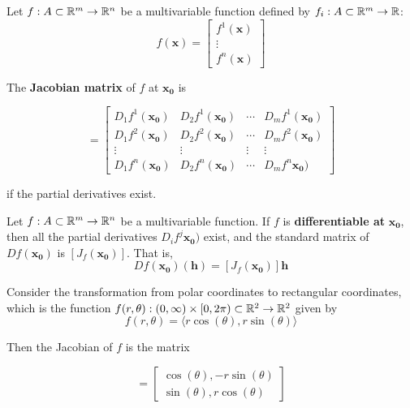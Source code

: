 \begin{definition}
    Let $f : A \subset \mathbb{R}^m \to \mathbb{R}^n$ be a multivariable function defined by $f_i  : A \subset \mathbb{R}^m \to \mathbb{R}$:
    \begin{equation*}
        f(\bm{x}) = \begin{bmatrix}
f^1(\bm{x}) \\
\vdots \\
f^n(\bm{x})
\end{bmatrix}
    \end{equation*}
    
    The \textbf{Jacobian matrix} of $f$ at $\bm{x_0}$ is 
    
    \begin{equation*}
        [J_f(\bm{x_0})] = \begin{bmatrix}
D_1f^1(\bm{x_0}) & D_2f^1(\bm{x_0}) & \cdots & D_mf^1(\bm{x_0}) \\
D_1f^2(\bm{x_0}) & D_2f^2(\bm{x_0}) & \cdots & D_mf^2(\bm{x_0}) \\
\vdots & \vdots & \vdots & \vdots\\
D_1f^n(\bm{x_0}) & D_2f^n(\bm{x_0}) & \cdots & D_mf^n\bm{x_0}) 
\end{bmatrix}
    \end{equation*}
    
    if the partial derivatives exist.
    
    \end{definition}

\begin{theorem}
    Let  $f : A \subset \mathbb{R}^m \to \mathbb{R}^n$ be a multivariable function.  If $f$ is \textbf{differentiable at} $\bm{x_0}$, then all the partial derivatives $D_if^j\bm{x_0})$ exist, and the standard matrix of $Df(\bm{x_0})$ is $[J_f(\bm{x_0})]$.  That is,
    $$Df(\bm{x_0})(\bm{h}) = [J_f(\bm{x_0})]\bm{h}$$
    
    \end{theorem}

    \begin{example}
    Consider the transformation from polar coordinates to rectangular coordinates, which is the function $f(r,\theta) : (0, \infty) \times [0, 2\pi) \subset \mathbb{R}^2 \to \mathbb{R}^2$ given by $$f(r, \theta) = \langle r\cos(\theta), r\sin(\theta) \rangle$$

    Then the Jacobian of $f$ is the matrix

\begin{equation*}
        [J_f(r, \theta)] = \begin{bmatrix}
\cos(\theta), -r\sin(\theta) \\
\sin(\theta), r\cos(\theta)  
\end{bmatrix}
    \end{equation*}
    
    \end{example}
    
